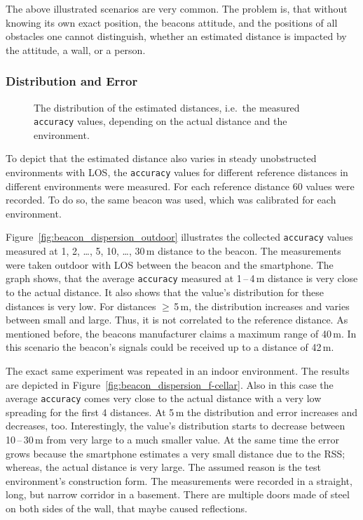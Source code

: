 The above illustrated scenarios are very common. The problem is, that without knowing its own exact position, the beacons attitude, and the positions of all obstacles one cannot distinguish, whether an estimated distance is impacted by the attitude, a wall, or a person.


\subsubsection*{Distribution and Error}
\begin{figure}
	
	\caption{The distribution of the estimated distances, i.e.\ the measured \texttt{accuracy} values, depending on the actual distance and the environment.}
	\label{fig:beacon_dispersion}
\end{figure}

To depict that the estimated distance also varies in steady unobstructed environments with \acs{LOS}, the \texttt{accuracy} values for different reference distances in different environments were measured. For each reference distance 60 values were recorded. To do so, the same beacon was used, which was calibrated for each environment.

Figure~\ref{fig:beacon_dispersion_outdoor} illustrates the collected \texttt{accuracy} values measured at 1, 2, \ldots, 5, 10, \ldots, 30\,m distance to the beacon. The measurements were taken outdoor with \acl{LOS} between the beacon and the smartphone. The graph shows, that the average \texttt{accuracy} measured at 1\,--\,4\,m distance is very close to the actual distance. It also shows that the value's distribution for these distances is very low. For distances $\geq$\,5\,m, the distribution increases and varies between small and large. Thus, it is not correlated to the reference distance. As mentioned before, the beacons manufacturer claims a maximum range of 40\,m. In this scenario the beacon's signals could be received up to a distance of 42\,m.

The exact same experiment was repeated in an indoor environment. The results are depicted in Figure~\ref{fig:beacon_dispersion_f-cellar}. Also in this case the average \texttt{accuracy} comes very close to the actual distance with a very low spreading for the first 4 distances. At 5\,m the distribution and error increases and decreases, too. Interestingly, the value's distribution starts to decrease between 10\,--\,30\,m from very large to a much smaller value. At the same time the error grows because the smartphone estimates a very small distance due to the \ac{RSS}; whereas, the actual distance is very large. The assumed reason is the test environment's construction form. The measurements were recorded in a straight, long, but narrow corridor in a basement. There are multiple doors made of steel on both sides of the wall, that maybe caused reflections.

